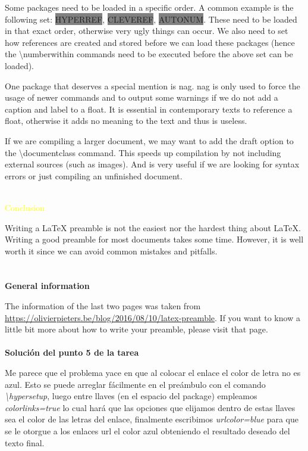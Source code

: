 \documentclass[12pt,a4paper]{article}
\begin{document}
Some packages need to be loaded in a specific order. A common example is the following set: \colorbox{gray}{HYPERREF},  \colorbox{gray}{CLEVEREF}, \colorbox{gray}{AUTONUM}. These need to be loaded in that exact order, otherwise very ugly things can occur. We also need to set how references are created and stored before we can load these packages (hence the \textbackslash{}numberwithin commands need to be executed before the above set can be loaded). \par
One package that deserves a special mention is nag. nag is only used to force the usage of newer commands and to output some warnings if we do not add a caption and label to a float. It is essential in contemporary texts to reference a float, otherwise it adds no meaning to the text and thus is useless. \par
If we are compiling a larger document, we may want to add the draft option to the \textbackslash{}documentclass command. This speeds up compilation by not including external sources (such as images). And is very useful if we are looking for syntax errors or just compiling an unfinished document.
\\
\\
\begin{center}
\textcolor{yellow}{Conclusion}
\end{center} \par
Writing a LaTeX preamble is not the easiest nor the hardest thing about LaTeX. Writing a good preamble for most documents takes some time. However, it is well worth it since we can avoid common mistakes and pitfalls. \\
\\
\\
\textbf{General information} \par
The information of the last two pages was taken from \url{ https://olivierpieters.be/blog/2016/08/10/latex-preamble}. If you want to know a little bit more about how to write your preamble, please visit that page.\\
\\
\textbf{Solución del punto 5 de la tarea} \par
Me parece que el problema yace en que al colocar el enlace el color de letra no es azul. Esto se puede arreglar fácilmente en el preámbulo con el comando \textit{\textbackslash hypersetup}, luego entre llaves (en el espacio del package) empleamos \textit{colorlinks=true}{ }lo cual hará que las opciones que elijamos dentro de estas llaves sea el color de las letras del enlace, finalmente escribimos \textit{urlcolor=blue}{ }para que se le otorgue a los enlaces url el color azul obteniendo el resultado deseado del texto final.
\end{document}

